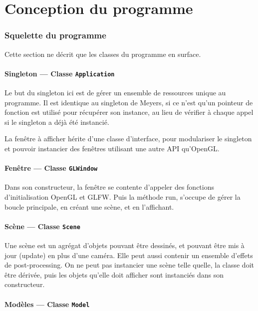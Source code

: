 \documentclass[pdftex, 11pt, a4paper, titlepage]{article}
\begin{document}
\pagebreak

\part{Conception du programme}

\section{Squelette du programme}

Cette section ne décrit que les classes du programme en surface.

\subsection{Singleton --- Classe \texttt{Application}}

Le but du singleton ici est de gérer un ensemble de ressources unique
au programme.  Il est identique au singleton de Meyers, si ce n'est
qu'un pointeur de fonction est utilisé pour récupérer son instance, au
lieu de vérifier à chaque appel si le singleton a déjà été instancié.

La fenêtre à afficher hérite d'une classe d'interface, pour
modulariser le singleton et pouvoir instancier des fenêtres utilisant
une autre API qu'OpenGL.

\subsection{Fenêtre --- Classe \texttt{GLWindow}}

Dans son constructeur, la fenêtre se contente d'appeler des fonctions
d'initialisation OpenGL et GLFW. Puis la méthode run, s'occupe de
gérer la boucle principale, en créant une scène, et en l'affichant.

\subsection{Scène --- Classe \texttt{Scene}}

Une scène est un agrégat d'objets pouvant être dessinés, et pouvant
être mis à jour (update) en plus d'une caméra.  Elle peut aussi
contenir un ensemble d'effets de post-processing. On ne peut pas
instancier une scène telle quelle, la classe doit être dérivée,
puis les objets qu'elle doit afficher sont instanciés dans son
constructeur.

\subsection{Modèles --- Classe \texttt{Model}}
\end{document}
